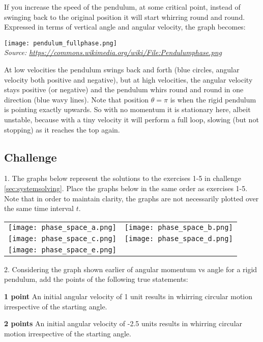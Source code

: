 If you increase the speed of the pendulum, at some critical point, instead of swinging back to the original position it will start whirring round and round. Expressed in terms of vertical angle and angular velocity, the graph becomes:

\texttt{[image: pendulum\_fullphase.png]}\\
\emph{\small{Source: \url{https://commons.wikimedia.org/wiki/File:Pendulumphase.png}}}

At low velocities the pendulum swings back and forth (blue circles, angular velocity both positive and negative), but at high velocities, the angular velocity stays positive (or negative) and the pendulum whirs round and round in one direction (blue wavy lines). Note that position $\theta = \pi$ is when the rigid pendulum is pointing exactly upwards. So with no momentum it is stationary here, albeit unstable, because with a tiny velocity it will perform a full loop, slowing (but not stopping) as it reaches the top again.

\subsection*{Challenge}
1. The graphs below represent the solutions to the exercises 1-5 in challenge \ref{sec:systemsolving}.
Place the graphs below in the same order as exercises 1-5. Note that in order to maintain clarity, the graphs are not necessarily plotted over the same time interval $t$.

\begin{tabular}{cc}
    \texttt{[image: phase\_space\_a.png]} &
    \texttt{[image: phase\_space\_b.png]} \\
    \texttt{[image: phase\_space\_c.png]} &
    \texttt{[image: phase\_space\_d.png]} \\
    \texttt{[image: phase\_space\_e.png]} &
\end{tabular}

\vspace{1cm}
2. Considering the graph shown earlier of angular momentum vs angle for a rigid pendulum, add the points of the following true statements:

\textbf{1 point} An initial angular velocity of 1 unit results in whirring circular motion irrespective of the starting angle.

\textbf{2 points} An initial angular velocity of -2.5 units results in whirring circular motion irrespective of the starting angle.

